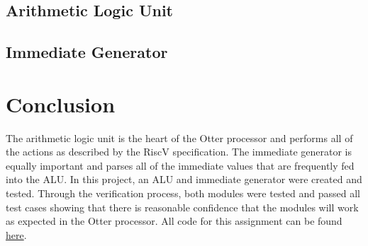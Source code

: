 \documentclass[
    a4paper, %
	12pt, %
    ]{CSSullivanBusinessReport}
\begin{document}
\begin{fullwidth}
\subsection{Arithmetic Logic Unit} %



\newpage
\subsection{Immediate Generator} %



\newpage



\section {Conclusion} %
\hypersetup{urlcolor=blue} 
The arithmetic logic unit is the heart of the Otter processor and performs all of the actions as described by the RiscV specification. The immediate generator is equally important and parses all of the immediate values that are frequently fed into the ALU. In this project, an ALU and immediate generator were created and tested. Through the verification process, both modules were tested and passed all test cases showing that there is reasonable confidence that the modules will work as expected in the Otter processor. 
All code for this assignment can be found \href{https://github.com/EthanV1920/CPE-233-Otter/tree/main}{here}.


\end{fullwidth}
\end{document}
